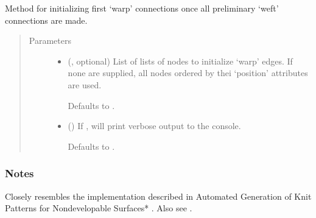 \documentclass[letterpaper,10pt,english]{sphinxmanual}
\begin{document}
\begin{fulllineitems}
\begin{fulllineitems}
\end{fulllineitems}


\begin{fulllineitems}
\label{\detokenize{cockatoo:cockatoo.KnitNetwork.initialize_warp_edges}}
Method for initializing first ‘warp’ connections once all preliminary
‘weft’ connections are made.
\begin{quote}\begin{description}
\item[{Parameters}] \leavevmode\begin{itemize}
\item {} 
 (, optional) \textendash{} 
List of lists of nodes to initialize ‘warp’ edges. If none are
supplied, all nodes ordered by thei ‘position’ attributes are
used.

Defaults to .


\item {} 
 (\sphinxstyleliteralemphasis{\sphinxupquote{, }}) \textendash{} 
If , will print verbose output to the console.

Defaults to .


\end{itemize}

\end{description}\end{quote}
\subsubsection*{Notes}

Closely resembles the implementation described in Automated Generation
of Knit Patterns for Non\sphinxhyphen{}developable Surfaces* \sphinxfootnotemark[1]. Also see  \sphinxfootnotemark[2].


\end{fulllineitems}
\end{fulllineitems}
\end{document}
